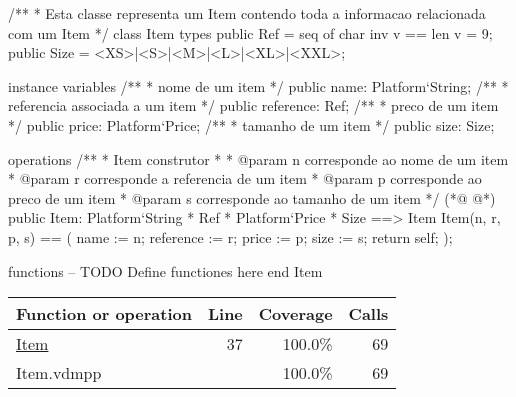 \begin{vdmpp}[breaklines=true]
/**
* Esta classe representa um Item contendo toda a informacao relacionada com um Item
*/
class Item
types
 public Ref =  seq of char 
 inv v == len v = 9;
 public Size = <XS>|<S>|<M>|<L>|<XL>|<XXL>;

instance variables
 /**
 * nome de um item
 */
 public name: Platform`String;
 /**
 * referencia associada a um item
 */
 public reference: Ref;
 /**
 * preco de um item
 */
 public price: Platform`Price;
 /**
 * tamanho de um item 
 */
 public size: Size;

operations
 /**
 * Item construtor
 * 
 * @param n corresponde ao nome de um item
 * @param r corresponde a referencia de um item
 * @param p corresponde ao preco de um item
 * @param s corresponde ao tamanho de um item
 */
(*@
\label{Item:37}
@*)
 public Item: Platform`String * Ref * Platform`Price * Size ==> Item 
  Item(n, r, p, s) == 
  (
   name := n;
   reference := r;
   price := p;
   size := s;
   return self;
  );
  
functions
 -- TODO Define functiones here
end Item
\end{vdmpp}
\bigskip
\begin{longtable}{|l|r|r|r|}
\hline
Function or operation & Line & Coverage & Calls \\
\hline
\hline
\hyperref[Item:37]{Item} & 37&100.0\% & 69 \\
\hline
\hline
Item.vdmpp & & 100.0\% & 69 \\
\hline
\end{longtable}

